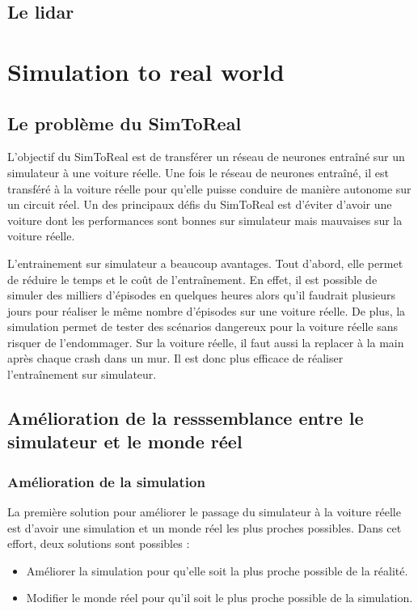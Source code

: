 \documentclass[french]{article}
\begin{document}
\subsection{Le lidar}


\section{Simulation to real world}

\subsection{Le problème du SimToReal}

L'objectif du SimToReal est de transférer un réseau de neurones entraîné sur un simulateur à une voiture réelle. 
Une fois le réseau de neurones entraîné, il est transféré à la voiture réelle pour qu'elle puisse conduire de manière 
autonome sur un circuit réel. Un des principaux défis du SimToReal est d'éviter d'avoir une voiture dont les performances sont bonnes sur simulateur mais mauvaises sur la voiture réelle.


L'entrainement sur simulateur a beaucoup avantages. Tout d'abord, elle permet de réduire le temps et le coût
de l'entraînement. En effet, il est possible de simuler des milliers d'épisodes en quelques heures 
alors qu'il faudrait plusieurs jours pour réaliser le même nombre d'épisodes sur une voiture réelle. De plus,
la simulation permet de tester des scénarios dangereux pour la voiture réelle sans risquer de l'endommager.
Sur la voiture réelle, il faut aussi la replacer à la main après chaque crash dans un mur. Il est donc plus
efficace de réaliser l'entraînement sur simulateur.

\subsection{Amélioration de la resssemblance entre le simulateur et le monde réel}

\subsubsection{Amélioration de la simulation}

La première solution pour améliorer le passage du simulateur à la voiture réelle est d'avoir une simulation et un monde réel les plus proches possibles. Dans cet effort, deux solutions sont possibles :
\begin{itemize}
    \item Améliorer la simulation pour qu'elle soit la plus proche possible de la réalité.
    \item Modifier le monde réel pour qu'il soit le plus proche possible de la simulation.
\end{itemize}
\end{document}
